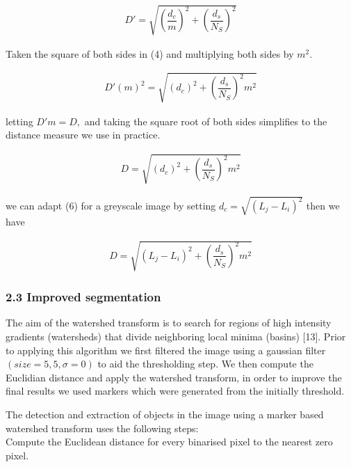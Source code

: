 \documentclass{article}
\begin{document}
\begin{align}
	\label{constantm}
	D' = \sqrt{(\dfrac{d_{c}}{m})^2 + (\dfrac{d_{s}}{N_{S}})^2} 
\end{align}

\begin{flushleft} 
	Taken the square of both sides in (4) and multiplying both sides by $m^2$.
\end{flushleft}

\begin{align}
	D'(m)^2 =\sqrt{ (d_{c})^2 + (\dfrac{d_{s}}{N_{S}})^2 m^2}
\end{align}

\begin{flushleft} 
	letting $ D'm = D,$ and taking the square root of both sides simplifies to the distance measure we use in practice.  
\end{flushleft}

\begin{align}
	D = \sqrt{(d_{c})^2 + (\dfrac{d_{s}}{N_{S}})^2 m^2} 
\end{align}

\begin{flushleft}	
	we can adapt (6) for a greyscale image  by setting $ d_{c} =\sqrt{ (L_{j} - L_{i})^2 }$   then we have
\end{flushleft}
\begin{align}
	D = \sqrt{(L_{j} - L_{i})^2 + (\dfrac{d_{s}}{N_{S}})^2 m^2}
\end{align}


\newpage

\subsubsection*{2.3 Improved segmentation} The aim of the watershed transform is to search for regions of high intensity gradients (watersheds) that divide neighboring local minima (basins) [13]. Prior to applying this algorithm we first filtered the image using a gaussian filter $(size = 5,5,  \sigma = 0)$ to aid the thresholding step. We then compute the Euclidian distance and apply the watershed transform, in order to improve the final results we used markers which were generated from the initially threshold.

The detection and extraction of objects in the image using a marker based watershed transform uses the following steps:\\


\hspace*{4ex}Compute the Euclidean distance for every binarised pixel to the nearest \hspace*{7ex} zero pixel.\\
\end{document}
